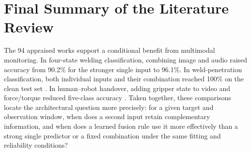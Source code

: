 \section{Final Summary of the Literature Review}

The 94 appraised works support a conditional benefit from multimodal monitoring. In four-state welding classification, combining image and audio raised accuracy from 90.2\% for the stronger single input to 96.1\%. In weld-penetration classification, both individual inputs and their combination reached 100\% on the clean test set \parencite{fan_dmaw_2026,hua_anti-interference_2026}. In human--robot handover, adding gripper state to video and force/torque reduced five-class accuracy \parencite{thoduka_multimodal_2024}. Taken together, these comparisons locate the architectural question more precisely: for a given target and observation window, when does a second input retain complementary information, and when does a learned fusion rule use it more effectively than a strong single predictor or a fixed combination under the same fitting and reliability conditions?

